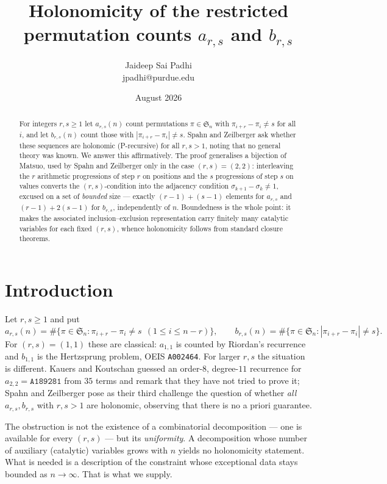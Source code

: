 \documentclass[11pt]{article}
\title{Holonomicity of the restricted permutation counts $a_{r,s}$ and $b_{r,s}$}
\author{Jaideep Sai Padhi\\ \small jpadhi@purdue.edu}
\date{August 2026}
\theoremstyle{definition}
\newcommand{\Sn}{\mathfrak{S}_n}
\newcommand{\ars}{a_{r,s}}
\newcommand{\brs}{b_{r,s}}
\begin{document}
\maketitle

\begin{abstract}
For integers $r,s\ge 1$ let $\ars(n)$ count permutations $\pi\in\Sn$ with
$\pi_{i+r}-\pi_i\neq s$ for all $i$, and let $\brs(n)$ count those with
$|\pi_{i+r}-\pi_i|\neq s$. Spahn and Zeilberger \cite{SZ} ask whether these
sequences are holonomic (P-recursive) for all $r,s>1$, noting that no general
theory was known. We answer this affirmatively. The proof generalises a
bijection of Matsuo, used by Spahn and Zeilberger only in the case
$(r,s)=(2,2)$: interleaving the $r$ arithmetic progressions of step $r$ on
positions and the $s$ progressions of step $s$ on values converts the
$(r,s)$-condition into the adjacency condition $\sigma_{k+1}-\sigma_k\neq 1$,
excused on a set of \emph{bounded} size --- exactly $(r-1)+(s-1)$ elements for
$\ars$ and $(r-1)+2(s-1)$ for $\brs$, independently of $n$. Boundedness is the
whole point: it makes the associated inclusion--exclusion representation carry
finitely many catalytic variables for each fixed $(r,s)$, whence holonomicity
follows from standard closure theorems.
\end{abstract}

\section{Introduction}

Let $r,s\ge 1$ and put
\[
  \ars(n) = \#\{\pi\in\Sn : \pi_{i+r}-\pi_i \neq s \ \ (1\le i\le n-r)\},
  \qquad
  \brs(n) = \#\{\pi\in\Sn : |\pi_{i+r}-\pi_i| \neq s\}.
\]
For $(r,s)=(1,1)$ these are classical: $a_{1,1}$ is counted by Riordan's
recurrence and $b_{1,1}$ is the Hertzsprung problem, OEIS \texttt{A002464}.
For larger $r,s$ the situation is different. Kauers and Koutschan
\cite{KK} guessed an order-$8$, degree-$11$ recurrence for
$a_{2,2}=\texttt{A189281}$ from $35$ terms and remark that they have not tried
to prove it; Spahn and Zeilberger \cite{SZ} pose as their third challenge the
question of whether \emph{all} $\ars,\brs$ with $r,s>1$ are holonomic, observing
that there is no a priori guarantee.

The obstruction is not the existence of a combinatorial decomposition --- one
is available for every $(r,s)$ --- but its \emph{uniformity}. A decomposition
whose number of auxiliary (catalytic) variables grows with $n$ yields no
holonomicity statement. What is needed is a description of the constraint whose
exceptional data stays bounded as $n\to\infty$. That is what we supply.
\end{document}
